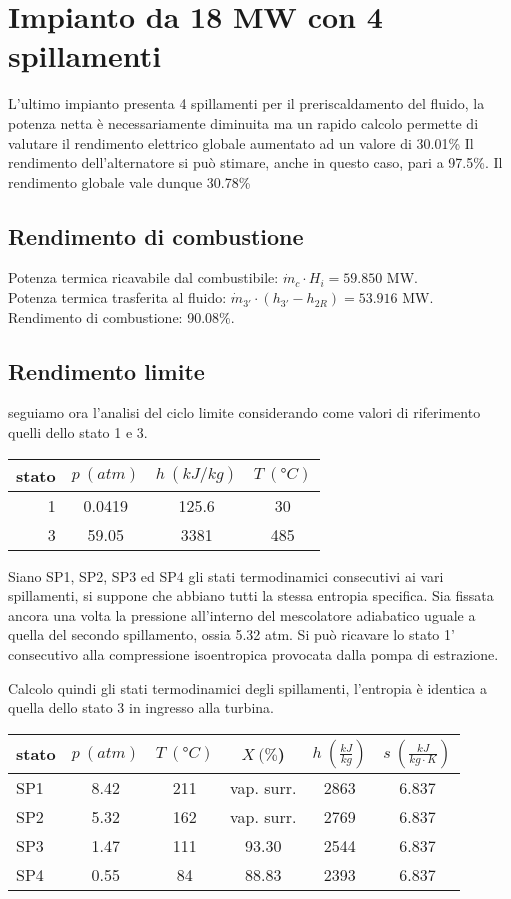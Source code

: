 \section{Impianto da 18 MW con 4 spillamenti}
L'ultimo impianto presenta 4 spillamenti per il preriscaldamento del fluido, la potenza netta è necessariamente diminuita
ma un rapido calcolo permette di valutare il rendimento elettrico globale aumentato ad un valore di 30.01\%
Il rendimento dell'alternatore si può stimare, anche in questo caso, pari a 97.5\%.
Il rendimento globale vale dunque 30.78\%

\subsection{Rendimento di combustione}
Potenza termica ricavabile dal combustibile: $\dot m_c \cdot H_i = 59.850$ MW.\\
Potenza termica trasferita al fluido: $\dot m_{3'} \cdot (h_{3'} - h_{2R}) = 53.916$ MW.\\
Rendimento di combustione: 90.08\%.

\subsection{Rendimento limite}
seguiamo ora l'analisi del ciclo limite considerando come valori di riferimento quelli dello stato 1 e 3.
\begin{center}
    \begin{tabular}{r|c|c|c}
        stato    & $p\ (atm)$ & $h\ (kJ/kg)$ & $T\ (\text{°}C) $\\ \hline
        1   &        0.0419 &          125.6   &           30     \\ \hline
        3   &        59.05  &           3381   &           485
    \end{tabular}
\end{center}
Siano SP1, SP2, SP3 ed SP4 gli stati termodinamici consecutivi ai vari spillamenti, si suppone che abbiano tutti la stessa entropia specifica.
Sia fissata ancora una volta la pressione all'interno del mescolatore adiabatico uguale a quella del secondo spillamento, ossia 5.32 atm.
Si può ricavare lo stato 1' consecutivo alla compressione isoentropica provocata dalla pompa di estrazione.

Calcolo quindi gli stati termodinamici degli spillamenti, l'entropia è identica a quella dello stato 3 in ingresso alla turbina.
\begin{center}
    \begin{tabular}{l|c|c|c|c|c}
        stato    & $p\ (atm)$ & $T\ (\text{°}C) $&$X\ (\%$)& $h\ (\frac{kJ}{kg})$  & $s\ (\frac{kJ}{kg\cdot K})$\\ \hline
        SP1   &       8.42 &     211     & vap. surr. &  2863   &6.837 \\ \hline    
        SP2  &        5.32    &    162    & vap. surr. & 2769  &6.837 \\ \hline    
        SP3  &      1.47       &    111    &  93.30    &2544 &6.837   \\ \hline
        SP4   &    0.55      &      84    &    88.83   & 2393&6.837 
    \end{tabular}
\end{center}

